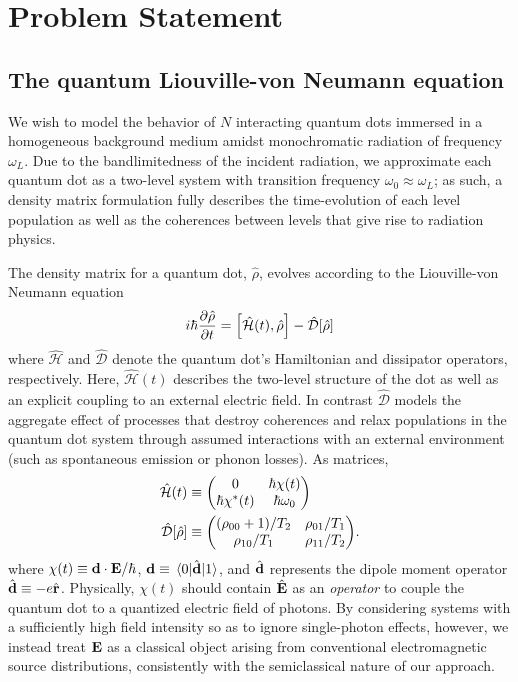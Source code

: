 \documentclass[conference]{IEEEtran}
\begin{document}
\section{Problem Statement}

\subsection{The quantum Liouville-von Neumann equation}
We wish to model the behavior of $N$ interacting quantum dots immersed in a homogeneous background medium amidst monochromatic radiation of frequency $\omega_L$. Due to the bandlimitedness of the incident radiation, we approximate each quantum dot as a two-level system with transition frequency $\omega_0 \approx \omega_L$; as such, a density matrix formulation fully describes the time-evolution of each level population as well as the coherences between levels that give rise to radiation physics.

The density matrix for a quantum dot, $\hat{\rho}$, evolves according to the Liouville-von Neumann equation
\begin{equation}
  i \hbar \pdv{\hat{\rho}}{t} = \commutator{\hat{\mathcal{H}}(t)}{\hat{\rho}} - \hat{\mathcal{D}}\qty[\hat{\rho}]
  \label{eq:liouville}
\end{equation}
where $\hat{\mathcal{H}}$ and $\hat{\mathcal{D}}$ denote the quantum dot's Hamiltonian and dissipator operators, respectively\cite{Breuer2002}.
Here, $\hat{\mathcal{H}}(t)$ describes the  two-level structure of the dot as well as an explicit coupling to an external electric field.
In contrast $\hat{\mathcal{D}}$ models the aggregate effect of processes that destroy coherences and relax populations in the quantum dot system through assumed interactions with an external environment (such as spontaneous emission or phonon losses).
As matrices,
\begin{subequations}
  \begin{align}
    \hat{\mathcal{H}}(t) &\equiv \mqty(0 & \hbar \chi(t) \\ \hbar \chi^*(t) & \hbar \omega_0) \label{eq:hamiltonian} \\
    \hat{\mathcal{D}}[\hat{\rho}] &\equiv \mqty((\rho_{00} + 1)/T_2 & \rho_{01}/T_1 \\ \rho_{10}/T_1 & \rho_{11}/T_2). \label{eq:dissipator}
  \end{align}
\end{subequations}
where $\chi(t) \equiv \vb{d} \cdot \vb{E}/\hbar$, $\vb{d} \equiv \matrixel{0}{\hat{\vb{d}}}{1}$, and $\hat{\vb{d}}$ represents the dipole moment operator $\hat{\vb{d}} \equiv -e \hat{\vb{r}}$. 
Physically, $\chi(t)$ should contain $\hat{\vb{E}}$ as an \emph{operator} to couple the quantum dot to a quantized electric field of photons.
By considering systems with a sufficiently high field intensity so as to ignore single-photon effects, however, we instead treat $\vb{E}$ as a classical object arising from conventional electromagnetic source distributions, consistently with the semiclassical nature of our approach.
\end{document}
